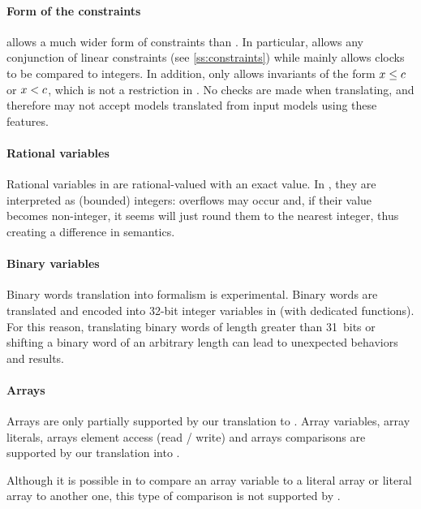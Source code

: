 \paragraph{Form of the constraints}
\imitator{} allows a much wider form of constraints than \uppaal{}.
In particular, \imitator{} allows any conjunction of linear constraints (see \cref{ss:constraints}) while \uppaal{} mainly allows clocks to be compared to integers.
In addition, \uppaal{} only allows invariants of the form $x \leq c$ or $x < c$, which is not a restriction in \imitator{}.
No checks are made when translating, and therefore \uppaal{} may not accept models translated from \imitator{} input models using these features.

\paragraph{Rational variables}
Rational variables in \imitator{} are rational-valued with an exact value.
In \uppaal{}, they are interpreted as (bounded) integers: overflows may occur and, if their value becomes non-integer, it seems \uppaal{} will just round them to the nearest integer, thus creating a difference in semantics.

\paragraph{Binary variables}

\begin{becareful}
Binary words translation into \uppaal{} formalism is experimental. Binary words are translated and encoded into 32-bit integer variables in \uppaal{} (with dedicated functions).
For this reason, translating binary words of length greater than 31~bits or shifting a binary word of an arbitrary length can lead to unexpected behaviors and results.
\end{becareful}

\paragraph{Arrays}

Arrays are only partially supported by our translation to \uppaal{}.
%
Array variables, array literals, arrays element access (read / write) and arrays comparisons are supported by our translation into \uppaal{}.

\begin{becareful}
	Although it is possible in \imitator{} to compare an array variable to a literal array or literal array to another one, this type of comparison is not supported by \uppaal{}.
\end{becareful}

